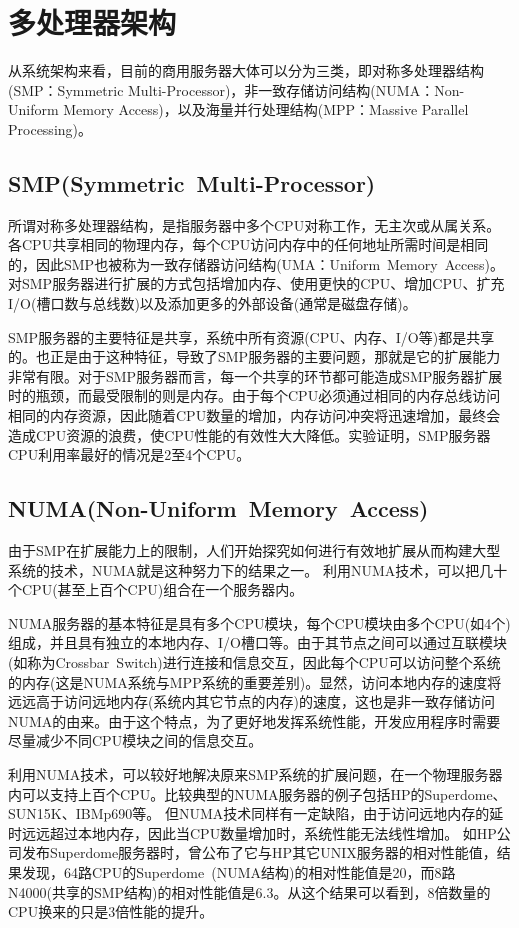 \section{多处理器架构}


从系统架构来看，目前的商用服务器大体可以分为三类，即对称多处理器结构(SMP：Symmetric Multi-Processor)，非一致存储访问结构(NUMA：Non-Uniform Memory Access)，以及海量并行处理结构(MPP：Massive Parallel Processing)。

\subsection{SMP(Symmetric Multi-Processor)}
所谓对称多处理器结构，是指服务器中多个CPU对称工作，无主次或从属关系。各CPU共享相同的物理内存，每个CPU访问内存中的任何地址所需时间是相同的，因此SMP也被称为一致存储器访问结构(UMA：Uniform Memory Access)。对SMP服务器进行扩展的方式包括增加内存、使用更快的CPU、增加CPU、扩充I/O(槽口数与总线数)以及添加更多的外部设备(通常是磁盘存储)。

SMP服务器的主要特征是共享，系统中所有资源(CPU、内存、I/O等)都是共享的。也正是由于这种特征，导致了SMP服务器的主要问题，那就是它的扩展能力非常有限。对于SMP服务器而言，每一个共享的环节都可能造成SMP服务器扩展时的瓶颈，而最受限制的则是内存。由于每个CPU必须通过相同的内存总线访问相同的内存资源，因此随着CPU数量的增加，内存访问冲突将迅速增加，最终会造成CPU资源的浪费，使CPU性能的有效性大大降低。实验证明，SMP服务器CPU利用率最好的情况是2至4个CPU。


\subsection{NUMA(Non-Uniform Memory Access)}

由于SMP在扩展能力上的限制，人们开始探究如何进行有效地扩展从而构建大型系统的技术，NUMA就是这种努力下的结果之一。
利用NUMA技术，可以把几十个CPU(甚至上百个CPU)组合在一个服务器内。

NUMA服务器的基本特征是具有多个CPU模块，每个CPU模块由多个CPU(如4个)组成，并且具有独立的本地内存、I/O槽口等。由于其节点之间可以通过互联模块(如称为Crossbar Switch)进行连接和信息交互，因此每个CPU可以访问整个系统的内存(这是NUMA系统与MPP系统的重要差别)。显然，访问本地内存的速度将远远高于访问远地内存(系统内其它节点的内存)的速度，这也是非一致存储访问NUMA的由来。由于这个特点，为了更好地发挥系统性能，开发应用程序时需要尽量减少不同CPU模块之间的信息交互。

利用NUMA技术，可以较好地解决原来SMP系统的扩展问题，在一个物理服务器内可以支持上百个CPU。比较典型的NUMA服务器的例子包括HP的Superdome、SUN15K、IBMp690等。
但NUMA技术同样有一定缺陷，由于访问远地内存的延时远远超过本地内存，因此当CPU数量增加时，系统性能无法线性增加。
如HP公司发布Superdome服务器时，曾公布了它与HP其它UNIX服务器的相对性能值，结果发现，64路CPU的Superdome (NUMA结构)的相对性能值是20，而8路N4000(共享的SMP结构)的相对性能值是6.3。从这个结果可以看到，8倍数量的CPU换来的只是3倍性能的提升。


